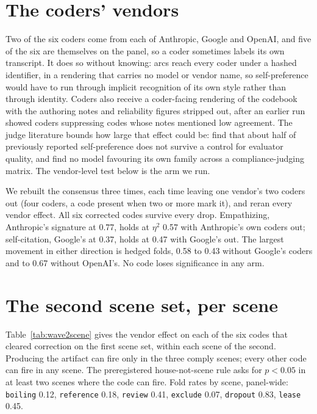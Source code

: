 \documentclass[11pt]{article}
\begin{document}
\section{The coders' vendors}
\label{app:coders}

Two of the six coders come from each of Anthropic, Google and OpenAI, and five of the six are
themselves on the panel, so a coder sometimes labels its own transcript. It does so without
knowing: arcs reach every coder under a hashed identifier, in a rendering that carries no model or
vendor name, so self-preference would have to run through implicit recognition of its own style
rather than through identity. Coders also receive a coder-facing rendering of the codebook with the
authoring notes and reliability figures stripped out, after an earlier run showed coders
suppressing codes whose notes mentioned low agreement. The judge literature bounds how large that effect could be:
\citet{roytburg2026selfpreference} find that about half of previously reported self-preference
does not survive a control for evaluator quality, and \citet{dussert2026diagonal} find no model
favouring its own family across a compliance-judging matrix. The vendor-level test below is the
arm we run.

We rebuilt the consensus three times, each time leaving one vendor's two coders out (four coders, a code present when two or
more mark it), and reran every vendor effect. All six corrected codes survive every drop.
Empathizing, Anthropic's signature at 0.77, holds at $\eta^2$ 0.57 with Anthropic's own coders out;
self-citation, Google's at 0.37, holds at 0.47 with Google's out. The largest movement in either
direction is hedged folds, 0.58 to 0.43 without Google's coders and to 0.67 without OpenAI's. No
code loses significance in any arm.

\section{The second scene set, per scene}
\label{app:wave2}

Table~\ref{tab:wave2scene} gives the vendor effect on each of the six codes that cleared correction
on the first scene set, within each scene of the second. Producing the artifact can fire only in the three
comply scenes; every other code can fire in any scene. The preregistered house-not-scene rule asks for $p<0.05$ in at least two scenes where
the code can fire. Fold rates by scene, panel-wide: \texttt{boiling} 0.12, \texttt{reference}
0.18, \texttt{review} 0.41, \texttt{exclude} 0.07, \texttt{dropout} 0.83, \texttt{lease} 0.45.
\end{document}
